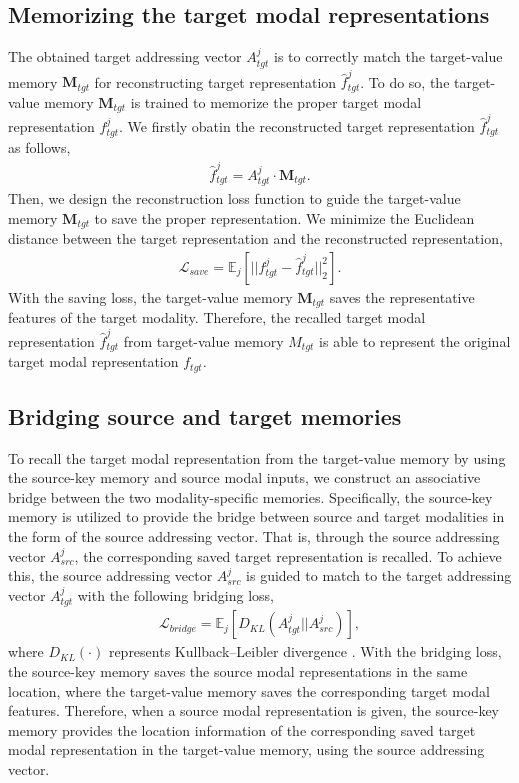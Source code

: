 \documentclass[10pt,twocolumn,letterpaper]{article}
\begin{document}
\subsection{Memorizing the target modal representations}
The obtained target addressing vector $A^j_{tgt}$ is to correctly match the target-value memory $\mathbf{M}_{tgt}$ for reconstructing target representation $\hat{f}^j_{tgt}$. To do so, the target-value memory $\mathbf{M}_{tgt}$ is trained to memorize the proper target modal representation ${f}^j_{tgt}$. We firstly obatin the reconstructed target representation $\hat{f}^j_{tgt}$ as follows,
\begin{align}
\label{eq:4}
    \hat{f}^j_{tgt} = A^j_{tgt} \cdot \mathbf{M}_{tgt}.
\end{align}
Then, we design the reconstruction loss function to guide the target-value memory $\mathbf{M}_{tgt}$ to save the proper representation. We minimize the Euclidean distance between the target representation and the reconstructed representation,
\begin{align}
\label{eq:5}
    \mathcal{L}_{save} = \mathbb{E}_j[||f^j_{tgt} - \hat{f}^j_{tgt}||^2_2].
\end{align}
With the saving loss, the target-value memory $\mathbf{M}_{tgt}$ saves the representative features of the target modality. Therefore, the recalled target modal representation $\hat{f}^j_{tgt}$ from target-value memory $M_{tgt}$ is able to represent the original target modal representation $f_{tgt}$.

\subsection{Bridging source and target memories}
\vspace{-0.11cm}
To recall the target modal representation from the target-value memory by using the source-key memory and source modal inputs, we construct an associative bridge between the two modality-specific memories. Specifically, the source-key memory is utilized to provide the bridge between source and target modalities in the form of the source addressing vector. That is, through the source addressing vector $A^j_{src}$, the corresponding saved target representation is recalled.
To achieve this, the source addressing vector $A^j_{src}$ is guided to match to the target addressing vector $A^j_{tgt}$ with the following bridging loss,
\begin{align}
\label{eq:6}
    \mathcal{L}_{bridge} = \mathbb{E}_j[D_{KL}(A^j_{tgt}||A^j_{src})],
\end{align}
where $D_{KL}(\cdot)$ represents Kullback–Leibler divergence \cite{kullback1951kld}.
With the bridging loss, the source-key memory saves the source modal representations in the same location, where the target-value memory saves the corresponding target modal features. Therefore, when a source modal representation is given, the source-key memory provides the location information of the corresponding saved target modal representation in the target-value memory, using the source addressing vector.
\end{document}

